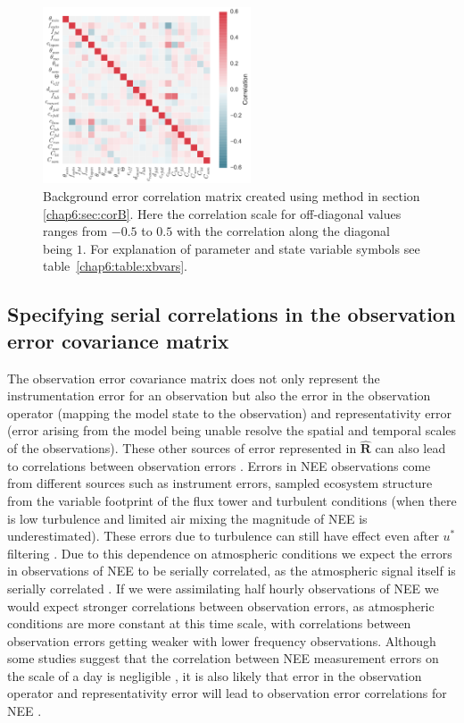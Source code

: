 \begin{figure}[ht]
    \centering
    \includegraphics[width=0.55\textwidth]{chapter/chapter6/bedccor2.pdf}
    \caption{Background error correlation matrix created using method in section \ref{chap6:sec:corB}. Here the correlation scale for off-diagonal values ranges from $-0.5$ to $0.5$ with the correlation along the diagonal being $1$. For explanation of parameter and state variable symbols see table~\ref{chap6:table:xbvars}.}
    \label{chap6:fig:Bcorr}
\end{figure}

\subsection{Specifying serial correlations in the observation error covariance matrix} \label{chap6:sec:corR}

The observation error covariance matrix does not only represent the instrumentation error for an observation but also the error in the observation operator (mapping the model state to the observation) and representativity error (error arising from the model being unable resolve the spatial and temporal scales of the observations). These other sources of error represented in $\hat{\textbf{R}}$ can also lead to correlations between observation errors \citep{Waller2014}. Errors in NEE observations come from different sources such as instrument errors, sampled ecosystem structure from the variable footprint of the flux tower and turbulent conditions (when there is low turbulence and limited air mixing the magnitude of NEE is underestimated). These errors due to turbulence can still have effect even after $u^{*}$ filtering \citep{Papale2006}. Due to this dependence on atmospheric conditions we expect the errors in observations of NEE to be serially correlated, as the atmospheric signal itself is serially correlated \citep{Daley1992}. If we were assimilating half hourly observations of NEE we would expect stronger correlations between observation errors, as atmospheric conditions are more constant at this time scale, with correlations between observation errors getting weaker with lower frequency observations. Although some studies suggest that the correlation between NEE measurement errors on the scale of a day is negligible \citep{lasslop:hal-00297973}, it is also likely that error in the observation operator and representativity error will lead to observation error correlations for NEE \citep{Waller2014}.

